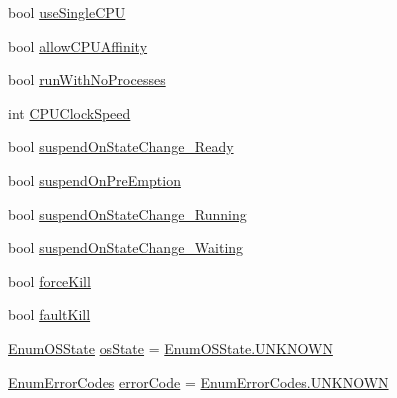 \begin{DoxyCompactItemize}
\item 
bool \hyperlink{class_c_p_u___o_s___simulator_1_1_operating___system_1_1_o_s_core_ac9667b36d2359ddf024ded0a57ba20be}{use\+Single\+C\+P\+U}
\item 
bool \hyperlink{class_c_p_u___o_s___simulator_1_1_operating___system_1_1_o_s_core_ad3fc35d621bf2c2afc8b2a66fc38d2c0}{allow\+C\+P\+U\+Affinity}
\item 
bool \hyperlink{class_c_p_u___o_s___simulator_1_1_operating___system_1_1_o_s_core_ac0526b86d9657a372e44664acf103438}{run\+With\+No\+Processes}
\item 
int \hyperlink{class_c_p_u___o_s___simulator_1_1_operating___system_1_1_o_s_core_a99f66d92928cea0a61e21ea427f16ab2}{C\+P\+U\+Clock\+Speed}
\item 
bool \hyperlink{class_c_p_u___o_s___simulator_1_1_operating___system_1_1_o_s_core_a2ee0e6e84ca8fd9b7d3daf279d038640}{suspend\+On\+State\+Change\+\_\+\+Ready}
\item 
bool \hyperlink{class_c_p_u___o_s___simulator_1_1_operating___system_1_1_o_s_core_a99875cff5880ff8dce2c77758389491b}{suspend\+On\+Pre\+Emption}
\item 
bool \hyperlink{class_c_p_u___o_s___simulator_1_1_operating___system_1_1_o_s_core_af35a9cd41325505df4cc3894c4b297b4}{suspend\+On\+State\+Change\+\_\+\+Running}
\item 
bool \hyperlink{class_c_p_u___o_s___simulator_1_1_operating___system_1_1_o_s_core_aebfddcf30c39c36876e07017fef6605f}{suspend\+On\+State\+Change\+\_\+\+Waiting}
\item 
bool \hyperlink{class_c_p_u___o_s___simulator_1_1_operating___system_1_1_o_s_core_aaa9fd56285fb7a3d8718f81e8df847ac}{force\+Kill}
\item 
bool \hyperlink{class_c_p_u___o_s___simulator_1_1_operating___system_1_1_o_s_core_a94ab635fc88b9a85556a55c8f2c49b89}{fault\+Kill}
\item 
\hyperlink{namespace_c_p_u___o_s___simulator_1_1_operating___system_a03a98a403abc737c106a8f92db5bffc1}{Enum\+O\+S\+State} \hyperlink{class_c_p_u___o_s___simulator_1_1_operating___system_1_1_o_s_core_ad428ed8c6f24743d016c9ba44ca129a5}{os\+State} = \hyperlink{namespace_c_p_u___o_s___simulator_1_1_operating___system_aea0b669d1bbf5690ae34ac2f8bef9470a696b031073e74bf2cb98e5ef201d4aa3}{Enum\+O\+S\+State.\+U\+N\+K\+N\+O\+W\+N}
\item 
\hyperlink{namespace_c_p_u___o_s___simulator_1_1_operating___system_aea0b669d1bbf5690ae34ac2f8bef9470}{Enum\+Error\+Codes} \hyperlink{class_c_p_u___o_s___simulator_1_1_operating___system_1_1_o_s_core_a321ac6d45675953550f32e23068e194f}{error\+Code} = \hyperlink{namespace_c_p_u___o_s___simulator_1_1_operating___system_aea0b669d1bbf5690ae34ac2f8bef9470a696b031073e74bf2cb98e5ef201d4aa3}{Enum\+Error\+Codes.\+U\+N\+K\+N\+O\+W\+N}

\end{DoxyCompactItemize}
